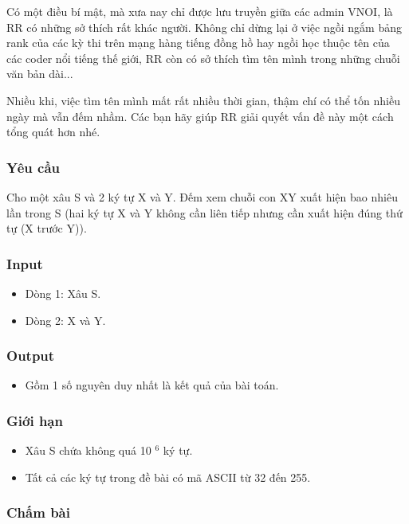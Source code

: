 



   Có một điều bí mật, mà xưa nay chỉ được lưu truyền giữa các admin VNOI, là RR có những sở thích rất khác người. Không chỉ dừng lại ở việc ngồi ngắm bảng rank của các kỳ thi trên mạng hàng tiếng đồng hồ hay ngồi học thuộc tên của các coder nổi tiếng thế giới, RR còn có sở thích tìm tên mình trong những chuỗi văn bản dài...  

   Nhiều khi, việc tìm tên mình mất rất nhiều thời gian, thậm chí có thể tốn nhiều ngày mà vẫn đếm nhầm. Các bạn hãy giúp RR giải quyết vấn đề này một cách tổng quát hơn nhé.  

\subsubsection{   Yêu cầu  }

   Cho một xâu S và 2 ký tự X và Y. Đếm xem chuỗi con XY xuất hiện bao nhiêu lần trong S (hai ký tự X và Y không cần liên tiếp nhưng cần xuất hiện đúng thứ tự (X trước Y)).  

\subsubsection{   Input  }
\begin{itemize}
	\item     Dòng 1: Xâu S.   
	\item     Dòng 2: X và Y.   
\end{itemize}

\subsubsection{   Output  }
\begin{itemize}
	\item     Gồm 1 số nguyên duy nhất là kết quả của bài toán.   
\end{itemize}

\subsubsection{   Giới hạn  }
\begin{itemize}
	\item     Xâu S chứa không quá 10    $^     6    $    ký tự.   
	\item     Tất cả các ký tự trong đề bài có mã ASCII từ 32 đến 255.   
\end{itemize}

\subsubsection{   Chấm bài  }

